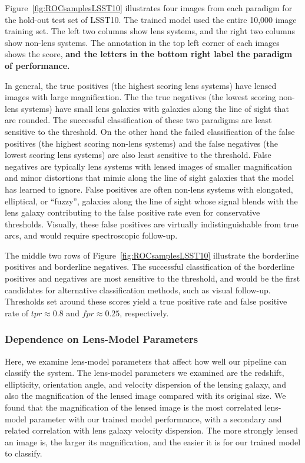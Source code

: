 \documentclass{emulateapj}
\newcommand{\todo}[1]{{\bf\color{blue} #1}}
\begin{document}
Figure~\ref{fig:ROCsamplesLSST10} illustrates four images from each
paradigm for the hold-out test set of LSST10.  The trained model used
the entire 10,000 image training set.  The left two columns show lens
systems, and the right two columns show non-lens systems.  The
annotation in the top left corner of each images shows the score,
\todo{and the letters in the bottom right label the paradigm of
  performance.}

In general, the true positives (the highest scoring lens systems) have
lensed images with large magnification.  The the true negatives (the
lowest scoring non-lens systems) have small lens galaxies with
galaxies along the line of sight that are rounded.  The successful
classification of these two paradigms are least sensitive to the
threshold.  On the other hand the failed classification of the false
positives (the highest scoring non-lens systems) and the false
negatives (the lowest scoring lens systems) are also least sensitive
to the threshold.  False negatives are typically lens systems with
lensed images of smaller magnification and minor distortions that
mimic along the line of sight galaxies that the model has learned to
ignore.  False positives are often non-lens systems with elongated,
elliptical, or ``fuzzy'', galaxies along the line of sight whose signal
blends with the lens galaxy contributing to the false positive rate
even for conservative thresholds.  Visually, these false positives are
virtually indistinguishable from true arcs, and would require
spectroscopic follow-up.

The middle two rows of Figure~\ref{fig:ROCsamplesLSST10} illustrate
the borderline positives and borderline negatives. The successful
classification of the borderline positives and negatives are most
sensitive to the threshold, and would be the first candidates for
alternative classification methods, such as visual follow-up.
Thresholds set around these scores yield a true positive rate and
false positive rate of $tpr\approx0.8$ and $fpr\approx0.25$,
respectively.

\subsubsection{Dependence on Lens-Model Parameters}

Here, we examine lens-model parameters that affect how well our
pipeline can classify the system.  The lens-model parameters we
examined are the redshift, ellipticity, orientation angle, and
velocity dispersion of the lensing galaxy, and also the magnification
of the lensed image compared with its original size.  We found that
the magnification of the lensed image is the most correlated
lens-model parameter with our trained model performance, with a
secondary and related correlation with lens galaxy velocity
dispersion.  The more strongly lensed an image is, the larger its
magnification, and the easier it is for our trained model to classify.
\end{document}
